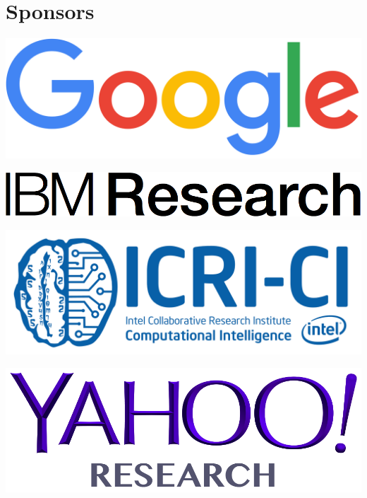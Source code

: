 \documentclass[a0,portrait]{a0poster}
\begin{document}
    \hfill
    \begin{minipage}{.2\textwidth}
        \section*{Sponsors}
        \includegraphics[width=\textwidth]{google_logo.png}

        \vspace{1cm}

        \includegraphics[width=\textwidth]{ibmresearch_logo.png}

        \vspace{1cm}

        \includegraphics[width=\textwidth]{icrici_logo.png}

        \vspace{1cm}

        \includegraphics[width=\textwidth]{yahoo_logo.png}


\end{minipage}
\end{document}
